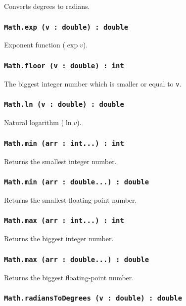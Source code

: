 Converts degrees to radians.

\subsubsection{\texttt{Math.exp (v : double) : double}}

Exponent function ($\exp{v}$).

\subsubsection{\texttt{Math.floor (v : double) : int}}

The biggest integer number which is smaller or equal to \texttt{v}.

\subsubsection{\texttt{Math.ln (v : double) : double}}

Natural logarithm ($\ln{v}$).

\subsubsection{\texttt{Math.min (arr : int...) : int}}

Returns the smallest integer number.

\subsubsection{\texttt{Math.min (arr : double...) : double}}

Returns the smallest floating-point number.

\subsubsection{\texttt{Math.max (arr : int...) : int}}

Returns the biggest integer number.

\subsubsection{\texttt{Math.max (arr : double...) : double}}

Returns the biggest floating-point number.

\subsubsection{\texttt{Math.radiansToDegrees (v : double) : double}}

